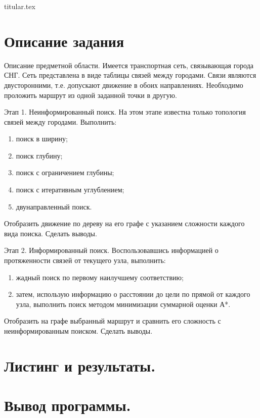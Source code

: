 \documentclass[11pt, a4paper]{article}
\begin{document}
{titular.tex}
\newpage

\section{Описание задания}

\noindent
Описание предметной области. Имеется транспортная сеть, связывающая
города СНГ. Сеть представлена в виде таблицы связей между городами. Связи
являются двусторонними, т.е. допускают движение в обоих направлениях.
Необходимо проложить маршрут из одной заданной точки в другую.

\medskip\noindent
Этап 1. Неинформированный поиск. На этом этапе известна только
топология связей между городами. Выполнить:
\begin{enumerate}
  \item поиск в ширину;
  \item поиск глубину;
  \item поиск с ограничением глубины;
  \item поиск с итеративным углублением;
  \item двунаправленный поиск.
\end{enumerate}

\noindent
Отобразить движение по дереву на его графе с указанием сложности
каждого вида поиска. Сделать выводы.

\medskip\noindent
Этап 2. Информированный поиск. Воспользовавшись информацией о
протяженности связей от текущего узла, выполнить:

\begin{enumerate}
  \item жадный поиск по первому наилучшему соответствию;
  \item затем, использую информацию о расстоянии до цели по прямой от
  каждого узла, выполнить поиск методом минимизации суммарной оценки А*.
\end{enumerate}

\noindent
Отобразить на графе выбранный маршрут и сравнить его сложность с
неинформированным поиском. Сделать выводы.

\section{Листинг и результаты.}





\section{Вывод программы.}
\end{document}
